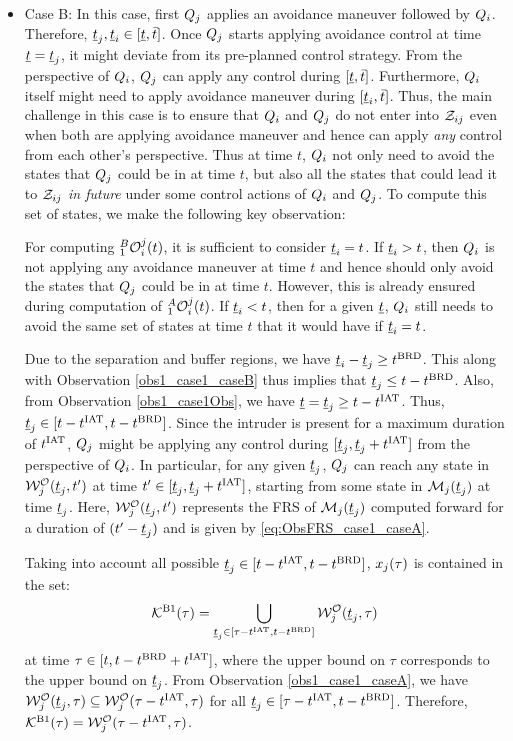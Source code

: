 \begin{itemize}[leftmargin=*]
\item \label{sec:intruderObs_case1_caseB} Case B: In this case, first $Q_j$ applies an avoidance maneuver followed by $Q_i$. Therefore, $\underline{t}_j, \underline{t}_i \in [\underline{t}, \bar{t}]$. Once $Q_j$ starts applying avoidance control at time $\underline{t} = \underline{t}_j$, it might deviate from its pre-planned control strategy. From the perspective of $Q_i$, $Q_j$ can apply any control during $[\underline{t}, \bar{t}]$. Furthermore, $Q_i$ itself might need to apply avoidance maneuver during $[\underline{t}_i, \bar{t}]$. Thus, the main challenge in this case is to ensure that $Q_i$ and $Q_j$ do not enter into $\mathcal{Z}_{ij}$ even when both are applying avoidance maneuver and hence can apply \textit{any} control from each other's perspective. Thus at time $t$, $Q_i$ not only need to avoid the states that $Q_j$ could be in at time $t$, but also all the states that could lead it to $\mathcal{Z}_{ij}$ \textit{in future} under some control actions of $Q_i$ and $Q_j$. To compute this set of states, we make the following key observation:
\begin{observation} \label{obs1_case1_caseB}
For computing $_1^B\mathcal{O}_i^j(t)$, it is sufficient to consider $\underline{t}_i = t$. If $\underline{t}_i > t$, then $Q_i$ is not applying any avoidance maneuver at time $t$ and hence should only avoid the states that $Q_j$ could be in at time $t$. However, this is already ensured during computation of $_1^A\mathcal{O}_i^j(t)$. If $\underline{t}_i < t$, then for a given $\underline{t}$, $Q_i$ still needs to avoid the same set of states at time $t$ that it would have if $\underline{t}_i = t$.  
\end{observation}

Due to the separation and buffer regions, we have $\underline{t}_i - \underline{t}_j \geq t^\text{BRD}$. This along with Observation \ref{obs1_case1_caseB} thus implies that $\underline{t}_j \leq t - t^\text{BRD}$. Also, from Observation \ref{obs1_case1Obs}, we have $\underline{t} = \underline{t}_j \geq t-t^\text{IAT}$. Thus, $\underline{t}_j \in [t-t^\text{IAT}, t-t^\text{BRD}]$. Since the intruder is present for a maximum duration of $t^\text{IAT}$, $Q_j$ might be applying any control during $[\underline{t}_j, \underline{t}_j + t^\text{IAT}]$ from the perspective of $Q_i$. In particular, for any given $\underline{t}_j$, $Q_j$ can reach any state in $\mathcal{W}_{j}^{\mathcal{O}}(\underline{t}_j, t')$ at time $t' \in [\underline{t}_j, \underline{t}_j+t^\text{IAT}]$, starting from some state in $\mathcal{M}_j(\underline{t}_j)$ at time $\underline{t}_j$. Here, $\mathcal{W}_{j}^{\mathcal{O}}(\underline{t}_j, t')$ represents the FRS of $\mathcal{M}_j(\underline{t}_j)$ computed forward for a duration of $(t' - \underline{t}_j)$ and is given by \eqref{eq:ObsFRS_case1_caseA}. 

Taking into account all possible $\underline{t}_j \in [t-t^\text{IAT}, t-t^\text{BRD}]$, $x_j(\tau)$ is contained in the set:
\begin{equation}
\mathcal{K}^{\text{B1}}(\tau) = \bigcup_{\underline{t}_j \in [\tau-t^\text{IAT}, t-t^\text{BRD}]} \mathcal{W}_{j}^{\mathcal{O}}(\underline{t}_j, \tau)
\end{equation} 
at time $\tau \in [t, t-t^\text{BRD}+t^\text{IAT}]$, where the upper bound on $\tau$ corresponds to the upper bound on $\underline{t}_j$. From Observation \ref{obs1_case1_caseA}, we have $\mathcal{W}_{j}^{\mathcal{O}}(\underline{t}_j, \tau) \subseteq \mathcal{W}_{j}^{\mathcal{O}}(\tau-t^\text{IAT}, \tau)$ for all $\underline{t}_j \in [\tau-t^\text{IAT}, t-t^\text{BRD}]$. Therefore, $\mathcal{K}^{\text{B1}}(\tau) = \mathcal{W}_{j}^{\mathcal{O}}(\tau-t^\text{IAT}, \tau)$.


\end{itemize}
